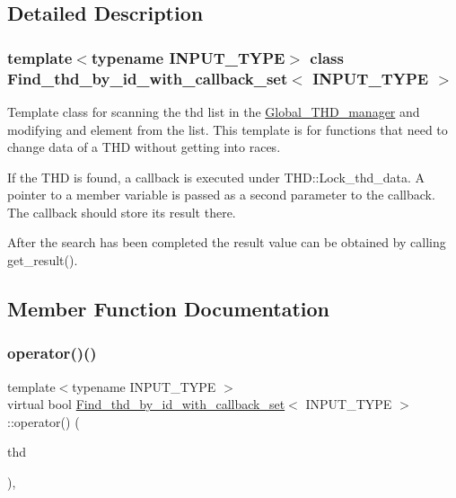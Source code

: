\subsection{Detailed Description}
\subsubsection*{template$<$typename I\+N\+P\+U\+T\+\_\+\+T\+Y\+PE$>$\newline
class Find\+\_\+thd\+\_\+by\+\_\+id\+\_\+with\+\_\+callback\+\_\+set$<$ I\+N\+P\+U\+T\+\_\+\+T\+Y\+P\+E $>$}

Template class for scanning the thd list in the \mbox{\hyperlink{classGlobal__THD__manager}{Global\+\_\+\+T\+H\+D\+\_\+manager}} and modifying and element from the list. This template is for functions that need to change data of a T\+HD without getting into races.

If the T\+HD is found, a callback is executed under T\+H\+D\+::\+Lock\+\_\+thd\+\_\+data. A pointer to a member variable is passed as a second parameter to the callback. The callback should store its result there.

After the search has been completed the result value can be obtained by calling get\+\_\+result(). 

\subsection{Member Function Documentation}
\mbox{\label{classFind__thd__by__id__with__callback__set_a3a8c6f9be71c9572a34fece05ef95add}} 
\subsubsection{\texorpdfstring{operator()()}{operator()()}}
{\footnotesize\ttfamily template$<$typename I\+N\+P\+U\+T\+\_\+\+T\+Y\+PE $>$ \\
virtual bool \mbox{\hyperlink{classFind__thd__by__id__with__callback__set}{Find\+\_\+thd\+\_\+by\+\_\+id\+\_\+with\+\_\+callback\+\_\+set}}$<$ I\+N\+P\+U\+T\+\_\+\+T\+Y\+PE $>$\+::operator() (\begin{DoxyParamCaption}\item[{T\+HD $\ast$}]{thd }\end{DoxyParamCaption})\hspace{0.3cm}{\ttfamily [inline]}, {\ttfamily [virtual]}}

